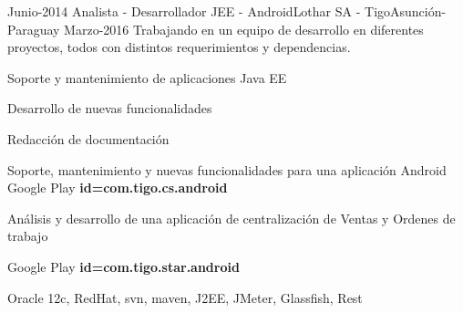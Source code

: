 \begin{experiences}
  \projectexperiences
    {Junio-2014}   {Analista - Desarrollador JEE - Android}{Lothar SA - Tigo}{Asunción-Paraguay}
    {Marzo-2016}
                {
                    Trabajando en un equipo de desarrollo en diferentes proyectos, todos con distintos requerimientos
                    y dependencias.
                }
                {
                        \begin{itemize}
                            \item Soporte y mantenimiento de aplicaciones Java EE
                            \item Desarrollo de nuevas funcionalidades
                            \item Redacción de documentación
                            \item Soporte, mantenimiento y nuevas funcionalidades
                            para una aplicación Android \tiny{Google Play \textbf{id=com.tigo.cs.android}}
                            \normalsize{\item Análisis y desarrollo de una aplicación de
                            centralización de Ventas y Ordenes de trabajo} \tiny{Google Play \textbf{id=com.tigo.star.android}}
                      \end{itemize}

                }
                {Oracle 12c, RedHat, svn, maven, J2EE, JMeter, Glassfish, Rest}
  \emptySeparator


\end{experiences}

